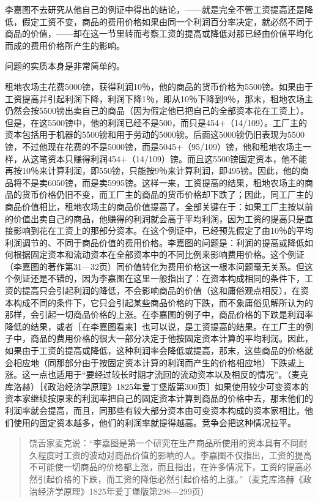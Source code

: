 李嘉图不去研究从他自己的例证中得出的结论，——就是完全不管工资提高还是降低，假定工资不变，商品的费用价格如果由同一个利润百分率决定，就必然不同于商品的价值，——却在这一节里转而考察工资的提高或降低对那已经由价值平均化而成的费用价格所产生的影响。

问题的实质本身是非常简单的。

租地农场主花费5000镑，获得利润10％，他的商品的货币价格为5500镑。如果由于工资提高并引起利润下降，利润下降1％，即从10％下降到9％，那末，租地农场主仍然会按5500镑出卖自己的商品（因为假定他已把自己的全部资本花在工资上）。但是，在这5500镑中，他的利润已经不是500，而只是454+（14/109）。工厂主的资本包括用于机器的5500镑和用于劳动的5000镑。后面这5000镑仍旧表现为5500镑，不过他现在花费的不是5000镑，而是5045+（95/109）镑，他和租地农场主一样，从这笔资本只赚得利润454+（14/109）镑。而且这5500镑固定资本，他不能再按10％来计算利润，即550镑，只能按9％来计算利润，即495镑。因此，他的商品将不是卖6050镑，而是卖5995镑。这样一来，工资提高的结果，租地农场主的商品的货币价格仍旧不变，而工厂主的商品的货币价格却下跌了；因此，同工厂主的商品价值相比，租地农场主的商品价值提高了。全部关键在于：如果工厂主按以前的价值出卖自己的商品，他赚得的利润就会高于平均利润，因为工资的提高只是直接影响到花在工资上的那部分资本。在这个例证中，已经预先假定了由10％的平均利润调节的、不同于商品价值的费用价格。李嘉图的问题是：利润的提高或降低如何根据固定资本和流动资本在全部资本中的不同比例来影响费用价格。这个例证（李嘉图的著作第31—32页）同价值转化为费用价格这一根本问题毫无关系。但这个例证还是不错的，因为李嘉图在这里一般指出了：在资本构成相同的条件下，工资的提高只会引起利润的降低，不会影响商品的价值（这和庸俗观点相反），在资本构成不同的条件下，它只会引起某些商品价格的下跌，而不象庸俗见解所认为的那样，会引起一切商品价格的上涨。在李嘉图的例子中，商品价格的下跌是利润率降低的结果，或者［在李嘉图看来］也可以说，是工资提高的结果。在工厂主的例子中，商品的费用价格的很大一部分决定于他按固定资本计算的平均利润。因此，如果由于工资的提高或降低，这种利润率会降低或提高，那末，这些商品的价格就会相应地（同那部分由于按固定资本计算的利润而产生的价格相应地）下跌或上涨。这一点也适用于“要经过较长时期才流回的流动资本以及相反的情况”。（麦克库洛赫）［《政治经济学原理》1825年爱丁堡版第300页］如果使用较少可变资本的资本家继续按原来的利润率把自己的固定资本计算到商品的价格中去，那末他们的利润率就会提高，而且，同那些有较大部分资本由可变资本构成的资本家相比，他们使用的固定资本越多，他们的利润率就提得越高。竞争会把这种情况拉平。

\begin{quote}{饶舌家麦克说：“李嘉图是第一个研究在生产商品所使用的资本具有不同耐久程度时工资的波动对商品价值的影响的人。李嘉图不仅指出，工资的提高不可能使一切商品的价格都上涨，而且指出，在许多情况下，工资的提高必然引起价格的下跌，而工资的降低必然引起价格的上涨。”（麦克库洛赫《政治经济学原理》1825年爱丁堡版第298—299页）}\end{quote}

